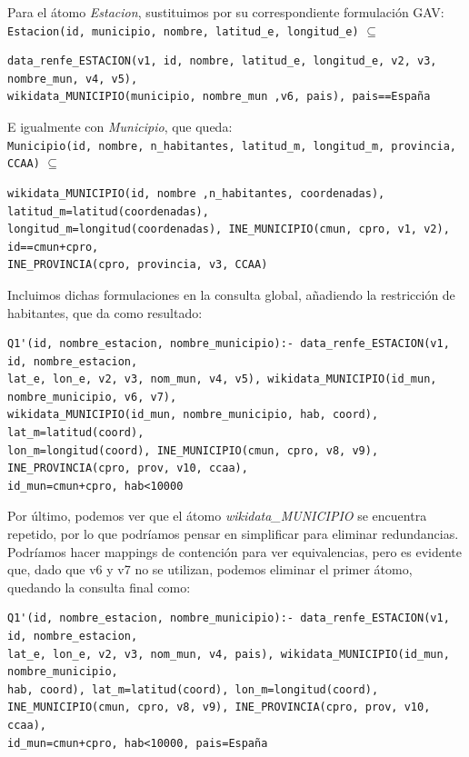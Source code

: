 Para el átomo \emph{Estacion}, sustituimos por su correspondiente
formulación GAV:
\texttt{Estacion(id,\ municipio,\ nombre,\ latitud\_e,\ longitud\_e)}
\(\subseteq\)

\begin{verbatim}
data_renfe_ESTACION(v1, id, nombre, latitud_e, longitud_e, v2, v3, nombre_mun, v4, v5), 
wikidata_MUNICIPIO(municipio, nombre_mun ,v6, pais), pais==España
\end{verbatim}

E igualmente con \emph{Municipio}, que queda:
\texttt{Municipio(id,\ nombre,\ n\_habitantes,\ latitud\_m,\ longitud\_m,\ provincia,\ CCAA)}
\(\subseteq\)

\begin{verbatim}
wikidata_MUNICIPIO(id, nombre ,n_habitantes, coordenadas), latitud_m=latitud(coordenadas), 
longitud_m=longitud(coordenadas), INE_MUNICIPIO(cmun, cpro, v1, v2), id==cmun+cpro, 
INE_PROVINCIA(cpro, provincia, v3, CCAA)
\end{verbatim}

Incluimos dichas formulaciones en la consulta global, añadiendo la
restricción de habitantes, que da como resultado:

\begin{verbatim}
Q1'(id, nombre_estacion, nombre_municipio):- data_renfe_ESTACION(v1, id, nombre_estacion, 
lat_e, lon_e, v2, v3, nom_mun, v4, v5), wikidata_MUNICIPIO(id_mun, nombre_municipio, v6, v7), 
wikidata_MUNICIPIO(id_mun, nombre_municipio, hab, coord), lat_m=latitud(coord), 
lon_m=longitud(coord), INE_MUNICIPIO(cmun, cpro, v8, v9), 
INE_PROVINCIA(cpro, prov, v10, ccaa), 
id_mun=cmun+cpro, hab<10000
\end{verbatim}

Por último, podemos ver que el átomo \emph{wikidata\_MUNICIPIO} se
encuentra repetido, por lo que podríamos pensar en simplificar para
eliminar redundancias. Podríamos hacer mappings de contención para ver
equivalencias, pero es evidente que, dado que v6 y v7 no se utilizan,
podemos eliminar el primer átomo, quedando la consulta final como:

\begin{verbatim}
Q1'(id, nombre_estacion, nombre_municipio):- data_renfe_ESTACION(v1, id, nombre_estacion, 
lat_e, lon_e, v2, v3, nom_mun, v4, pais), wikidata_MUNICIPIO(id_mun, nombre_municipio, 
hab, coord), lat_m=latitud(coord), lon_m=longitud(coord), 
INE_MUNICIPIO(cmun, cpro, v8, v9), INE_PROVINCIA(cpro, prov, v10, ccaa), 
id_mun=cmun+cpro, hab<10000, pais=España
\end{verbatim}

